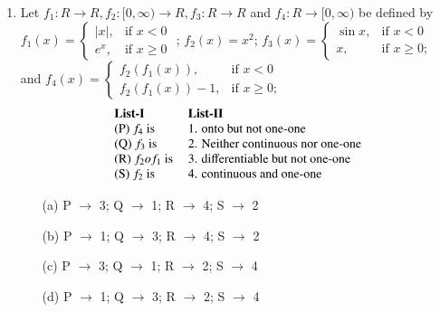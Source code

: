 \begin{enumerate}[label=\arabic*.,ref=\thesubsection.\theenumi]
\item Let $f_1:R \to R, f_2:[0,\infty) \to R, f_3:R \to R$ and $f_4:R \to [0,\infty)$ be defined by $f_1(x)=\begin{cases}
|x|, &\text{if $x<0$}\\
e^x, &\text{if $x\geq 0$}
\end{cases}$ ;
$f_2(x)=x^2$; $f_3(x)=\begin{cases}
\sin x, &\text{if $x<0$}\\
x, &\text{if $x\geq 0$};
\end{cases}$ and 
\clearpage
\newpage$f_4(x)=\begin{cases}
f_2(f_1(x)), &\text{if $x<0$}\\
f_2(f_1(x))-1, &\text{if $x\geq 0$};
\end{cases}$
\begin{align*}
\begin{tabular}{ll}
\textbf{List-I} &\textbf{List-II}\\
(P) $f_4$ is & 1. onto but not one-one \\
(Q) $f_3$ is & 2. Neither continuous nor one-one\\
(R) $f_2of_1$ is &3. differentiable but not one-one\\
(S) $f_2$ is &4. continuous and one-one
\end{tabular}
\end{align*}
\begin{itemize}
\item[(a)] P $\to$ 3; Q $\to$ 1; R $\to$ 4; S $\to$ 2
\item[(b)] P $\to$ 1; Q $\to$ 3; R $\to$ 4; S $\to$ 2
\item[(c)] P $\to$ 3; Q $\to$ 1; R $\to$ 2; S $\to$ 4
\item[(d)] P $\to$ 1; Q $\to$ 3; R $\to$ 2; S $\to$ 4
\end{itemize} \item[~]


\end{enumerate}
